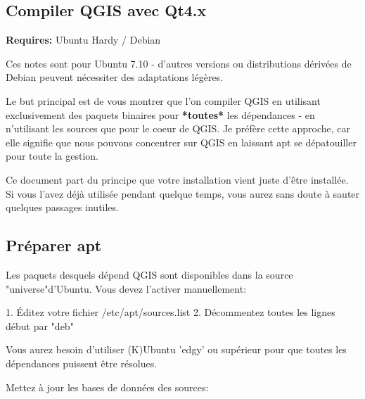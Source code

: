 \subsection{Compiler QGIS avec Qt4.x}
\textbf{Requires:} Ubuntu Hardy / Debian

Ces notes sont pour Ubuntu 7.10 - d'autres versions ou distributions d\'eriv\'ees de Debian peuvent n\'ecessiter des adaptations l\'eg\`eres.

Le but principal est de vous montrer que l'on compiler QGIS en utilisant exclusivement des paquets binaires pour \textbf{*toutes*} les d\'ependances - en n'utilisant les sources que pour le coeur de QGIS. Je pr\'ef\`ere cette approche, car elle signifie que nous pouvons concentrer sur QGIS en laissant apt se d\'epatouiller pour toute la gestion.

Ce document part du principe que votre installation vient juste d'\^etre install\'ee. Si vous l'avez d\'ej\`a utilis\'ee pendant quelque temps, vous aurez sans doute \`a sauter quelques passages inutiles.

% 
% 
% 
% 

\subsection{Pr\'eparer apt}
Les paquets desquels d\'epend QGIS sont disponibles dans la source "universe"d'Ubuntu. Vous devez l'activer manuellement:

1. \'Editez votre fichier /etc/apt/sources.list   
2. D\'ecommentez toutes les lignes d\'ebut par "deb"

Vous aurez besoin d'utiliser (K)Ubuntu 'edgy' ou sup\'erieur pour que toutes les d\'ependances puissent \^etre r\'esolues.

Mettez \`a jour les bases de donn\'ees des sources:


